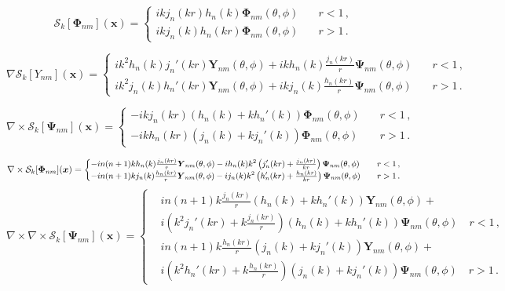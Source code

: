 \documentclass[11pt]{article}
\newcommand\bx{\boldsymbol x}
\newcommand\bY{\boldsymbol Y}
\newcommand\bPhi{\boldsymbol \Phi}
\newcommand\bPsi{\boldsymbol \Psi}
\newcommand\cS{\mathcal{S}}
\theoremstyle{definition}
\theoremstyle{remark}
\numberwithin{equation}{section}
\begin{document}
\begin{equation}
\cS_{k}[\bPhi_{nm}](\bx) = \begin{cases}
  ik j_{n}(kr) h_{n}(k) \bPhi_{nm}(\theta,\phi) \quad & r<1 \, ,\\
  ik j_{n}(k) h_{n}(kr) \bPhi_{nm}(\theta,\phi) \quad & r>1 \,.
  \end{cases}
\end{equation}

\begin{equation}
\nabla \cS_{k}[Y_{nm}](\bx) = \begin{cases} 
ik^2 h_{n}(k) j_{n}'(kr) \bY_{nm}(\theta,\phi) + ikh_{n}(k) \frac{j_{n}(kr)}{r} \bPsi_{nm}(\theta,\phi) &\quad r< 1\, ,\\
ik^2 j_{n}(k) h_{n}'(kr) \bY_{nm}(\theta,\phi) + ikj_{n}(k) \frac{h_{n}(kr)}{r} \bPsi_{nm}(\theta,\phi) &\quad r>1\, .
\end{cases}
\end{equation}

\begin{equation}
\nabla \times \cS_{k}[\bPsi_{nm}](\bx) = \begin{cases}
 -i k j_{n}(kr) \left( h_{n}(k) + kh_{n}'(k) \right) \bPhi_{nm}(\theta,\phi) &\quad r<1\, ,\\
  -i k h_{n}(kr) \left( j_{n}(k) + kj_{n}'(k) \right) \bPhi_{nm}(\theta,\phi) &\quad r>1\, .
  \end{cases}
\end{equation}

\begin{equation}
\nabla \times \cS_{k}[\bPhi_{nm}](\bx) = 
{\small 
\begin{cases}
-i n(n+1) k h_{n}(k) \frac{j_{n}(kr)}{r} \bY_{nm}(\theta,\phi) - i h_{n}(k) k^2 \left( j_{n}'(kr) + \frac{j_{n}(kr)}{kr}  \right) \bPsi_{nm}(\theta,\phi) &\quad r<1 \, , \\
-i n(n+1) k j_{n}(k) \frac{h_{n}(kr)}{r} \bY_{nm}(\theta,\phi) - i j_{n}(k) k^2 \left( h_{n}'(kr) + \frac{h_{n}(kr)}{kr}  \right) \bPsi_{nm}(\theta,\phi) &\quad r>1 \, .
\end{cases}
}
\end{equation}
\begin{equation}
\nabla \times \nabla \times \cS_{k}[\bPsi_{nm}](\bx) = \begin{cases}
& i n(n+1) k \frac{j_{n}(kr)}{r} \left( h_{n}(k) + kh_{n}'(k) \right)  \bY_{nm}(\theta,\phi) + \\
& i\left(k^2 j_{n}'(kr) + k\frac{j_{n}(kr)}{r}\right) \left( h_{n}(k) + kh_{n}'(k) \right)  \bPsi_{nm}(\theta,\phi) \quad r<1\, , \\
& i n(n+1) k \frac{h_{n}(kr)}{r} \left( j_{n}(k) + kj_{n}'(k) \right)  \bY_{nm}(\theta,\phi) + \\
& i\left(k^2 h_{n}'(kr) + k\frac{h_{n}(kr)}{r}\right) \left( j_{n}(k) + kj_{n}'(k) \right)  \bPsi_{nm}(\theta,\phi) \quad r>1\, .
\end{cases}
\end{equation}
\end{document}
